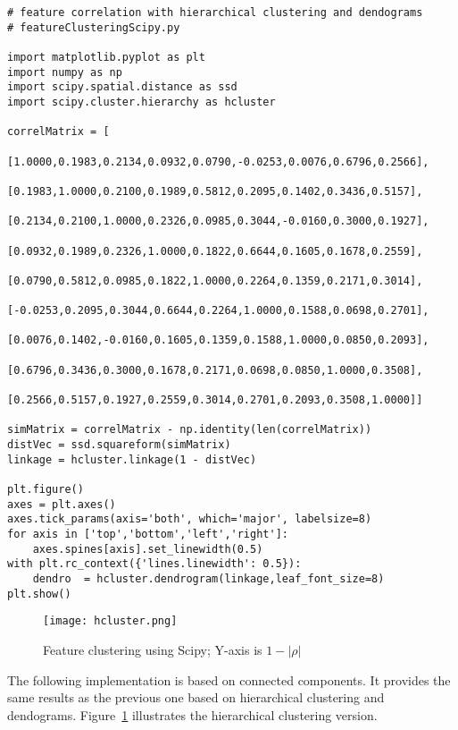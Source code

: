 \documentclass[oneside,10pt]{book}
\begin{document}
\begin{lstlisting}
# feature correlation with hierarchical clustering and dendograms
# featureClusteringScipy.py

import matplotlib.pyplot as plt
import numpy as np
import scipy.spatial.distance as ssd
import scipy.cluster.hierarchy as hcluster

correlMatrix = [
      [1.0000,0.1983,0.2134,0.0932,0.0790,-0.0253,0.0076,0.6796,0.2566],
      [0.1983,1.0000,0.2100,0.1989,0.5812,0.2095,0.1402,0.3436,0.5157],
      [0.2134,0.2100,1.0000,0.2326,0.0985,0.3044,-0.0160,0.3000,0.1927],
      [0.0932,0.1989,0.2326,1.0000,0.1822,0.6644,0.1605,0.1678,0.2559],
      [0.0790,0.5812,0.0985,0.1822,1.0000,0.2264,0.1359,0.2171,0.3014],
      [-0.0253,0.2095,0.3044,0.6644,0.2264,1.0000,0.1588,0.0698,0.2701],
      [0.0076,0.1402,-0.0160,0.1605,0.1359,0.1588,1.0000,0.0850,0.2093],
      [0.6796,0.3436,0.3000,0.1678,0.2171,0.0698,0.0850,1.0000,0.3508],
      [0.2566,0.5157,0.1927,0.2559,0.3014,0.2701,0.2093,0.3508,1.0000]]

simMatrix = correlMatrix - np.identity(len(correlMatrix))
distVec = ssd.squareform(simMatrix)
linkage = hcluster.linkage(1 - distVec)

plt.figure()
axes = plt.axes()
axes.tick_params(axis='both', which='major', labelsize=8)
for axis in ['top','bottom','left','right']:
    axes.spines[axis].set_linewidth(0.5)
with plt.rc_context({'lines.linewidth': 0.5}):
    dendro  = hcluster.dendrogram(linkage,leaf_font_size=8)
plt.show()
\end{lstlisting}


\begin{figure}[H]
\centering
\texttt{[image: hcluster.png]}
\caption{Feature clustering using Scipy; Y-axis is $1-|\rho|$}
\label{fig:picbhggg2xs}
\end{figure}

\noindent The following implementation is based on connected components. It provides the same results as the
 previous one based on hierarchical clustering and dendograms. Figure~\ref{fig:picbhggg2xs} illustrates the
 hierarchical clustering version. \vspace{1ex}
\end{document}
